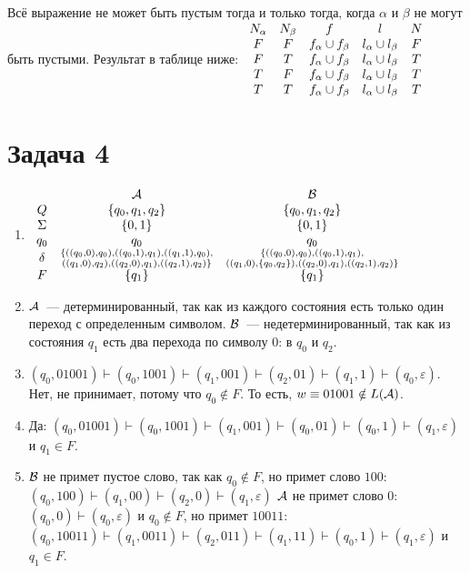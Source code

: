 \documentclass[a4paper]{article}
\begin{document}
\begin{enumerate}
Всё выражение не может быть пустым тогда и только тогда, когда $\alpha$ и $\beta$ не могут быть пустыми. Результат в таблице ниже:
$
\newline
\begin{array}{ccccc}
N_\alpha & N_\beta & f & l & N\\
F & F & f_\alpha \cup f_\beta & l_\alpha \cup l_\beta & F \\
F & T & f_\alpha \cup f_\beta & l_\alpha \cup l_\beta & T\\
T & F & f_\alpha \cup f_\beta & l_\alpha \cup l_\beta & T\\
T & T & f_\alpha \cup f_\beta & l_\alpha \cup l_\beta & T\\
\end{array}
$
\end{enumerate}
\section*{Задача 4}
\begin{enumerate}[1.]
\item $\begin{array}{ccc}
& \cal A & \cal B \\
Q & \{q_0,q_1,q_2\} & \{q_0,q_1,q_2\}\\
\Sigma & \{0,1\} & \{0,1\}\\
q_0 & q_0 & q_0\\
\delta & \substack{\{((q_0,0),q_0),((q_0,1),q_1),((q_1,1),q_0),\\((q_1,0),q_2),((q_2,0),q_1),((q_2,1),q_2)\}} & \substack{\{((q_0,0),q_0),((q_0,1),q_1),\\((q_1,0),\{q_0,q_2\}),((q_2,0),q_1),((q_2,1),q_2)\}}\\
F & \{q_1\} & \{q_1\}\\
\end{array}$
\item $\cal A$~--- детерминированный, так как из каждого состояния есть только один переход с определенным символом.\newline
$\cal B$~--- недетерминированный, так как из состояния $q_1$ есть два перехода по символу $0$: в $q_0$ и $q_2$.
\item $(q_0,01001)\vdash(q_0,1001)\vdash(q_1,001)\vdash(q_2,01)\vdash(q_1,1)\vdash(q_0,\varepsilon)$. Нет, не принимает, потому что $q_0\notin F$. То есть, $w\equiv 01001\notin L(\cal A)$.
\item Да: $(q_0,01001)\vdash(q_0,1001)\vdash(q_1,001)\vdash(q_0,01)\vdash(q_0,1)\vdash(q_1,\varepsilon)$ и $q_1\in F$.
\item $\cal B$ не примет пустое слово, так как $q_0\notin F$, но примет слово $100$: $(q_0,100)\vdash(q_1,00)\vdash(q_2,0)\vdash(q_1,\varepsilon)$\newline
$\cal A$ не примет слово $0$: $(q_0,0)\vdash(q_0,\varepsilon)$ и $q_0\notin F$, но примет $10011$: $(q_0,10011)\vdash(q_1,0011)\vdash(q_2,011)\vdash(q_1,11)\vdash(q_0,1)\vdash(q_1,\varepsilon)$ и $q_1\in F$.
\end{enumerate}
\end{document}
